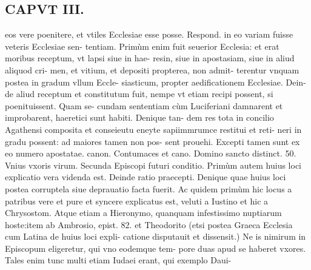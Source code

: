 \documentclass{article}
\begin{document}
\begin{pages}
\section*{CAPVT  III. }
\marginpar{[ p.105 ]}\pstart eos vere poenitere, et vtiles Ecclesiae esse posse. Respond. in eo variam fuisse veteris Ecclesiae sen- tentiam. Primùm enim fuit seuerior Ecclesia: et erat moribus receptum, vt lapsi siue in hae- resin, siue in apostasiam, siue in aliud aliquod cri- men, et vitium, et depositi propterea, non admit- terentur vnquam postea in gradum vllum Eccle- siasticum, propter aedificationem Ecclesiae. Dein- de aliud receptum et constitutum fuit, nempe vt etiam recipi possent, si poenituissent. Quam se- cundam sententiam cùm Luciferiani damnarent et improbarent, haeretici sunt habiti. Denique tan- dem res tota in concilio Agathensi composita et conseieutu eneyte sapiimmrumce restitui et reti- neri in gradu possent: ad maiores tamen non pos- sent prouehi. Excepti tamen sunt ex eo numero apostatae. canon. Contumaces et cano. Domino sancto distinct. 50.  \pend\pstart Vnius vxoris virum. Secunda Episcopi futuri conditio. Primùm autem huius loci explicatio vera videnda est. Deinde ratio praecepti. Denique  quae huius loci postea corruptela siue deprauatio facta fuerit.  \pend\pstart Ac quidem primùm hic locus a patribus vere et pure et syncere explicatus est, veluti a Iustino et hic a Chrysostom. Atque etiam a Hieronymo, quanquam infestissimo nuptiarum hoste:item ab Ambrosio, epist. 82. et Theodorito (etsi postea Graeca Ecclesia cum Latina de huius loci expli- catione disputauit et dissensit.) Ne is nimirum in Episcopum eligeretur, qui vno eodemque tem- pore duas apud se haberet vxores. Tales enim tunc multi etiam Iudaei erant, qui exemplo Daui-  \pend

\end{pages}
\end{document}

